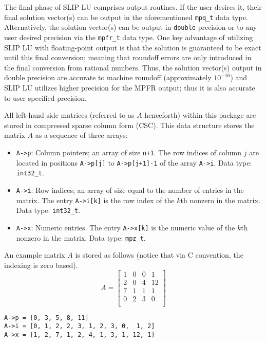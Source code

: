 \documentclass[12pt]{article}
\theoremstyle{definition}
\begin{document}
The final phase of SLIP LU comprises output routines. If the user desires it,
their final solution vector(s) can be output in the aforementioned \verb|mpq_t|
data type. Alternatively, the solution vector(s) can be output in \verb|double|
precision or to any user desired precision via the \verb|mpfr_t| data type. One
key advantage of utilizing SLIP LU with floating-point output is that the
solution is guaranteed to be exact until this final conversion; meaning that
roundoff errors are only introduced in the final conversion from rational
numbers. Thus, the solution vector(s) output in double precision are accurate
to machine roundoff (approximately $10^{-16}$) and SLIP LU utilizes higher
precision for the MPFR output; thus it is also accurate to user specified
precision.

All left-hand side matrices (referred to as $A$ henceforth) within this package
are stored in compressed sparse column form (CSC). This data structure
stores the matrix $A$ as a sequence of three arrays:

\begin{itemize}
\item
\verb|A->p|: Column pointers; an array of size \verb|n+1|. The row indices of
column $j$ are located in positions \verb|A->p[j]| to \verb|A->p[j+1]-1| of the
array \verb|A->i|. Data type: \verb|int32_t|.

\item
\verb|A->i|: Row indices; an array of size equal to the number of entries in
the matrix. The entry \verb|A->i[k]| is the row index of the $k$th nonzero in
the matrix. Data type: \verb|int32_t|.

\item
\verb|A->x|: Numeric entries. The entry \verb|A->x[k]| is the numeric value of
the $k$th nonzero in the matrix. Data type: \verb|mpz_t|.
\end{itemize}

An example matrix $A$ is stored as follows (notice that via C convention, the
indexing is zero based).
\[
A = \begin{bmatrix}
1 & 0 & 0 & 1 \\
2 & 0 & 4 & 12 \\
7 & 1 & 1 & 1 \\
0 & 2 & 3 & 0 \\
\end{bmatrix}
\]

{\small
\noindent \verb|A->p = [0, 3, 5, 8, 11]| \\
\verb|A->i = [0, 1, 2, 2, 3, 1, 2, 3, 0,  1, 2]| \\
\verb|A->x = [1, 2, 7, 1, 2, 4, 1, 3, 1, 12, 1]|
}
\end{document}
